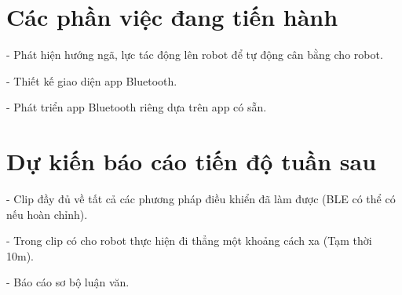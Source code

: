 \documentclass[12pt,a4paper]{article}
\begin{document}
\section{Các phần việc đang tiến hành }
\textrm{- Phát hiện hướng ngã, lực tác động lên robot để tự động cân bằng cho robot}.\par
\textrm{- Thiết kế giao diện app Bluetooth}.\par
\textrm{- Phát triển app Bluetooth riêng dựa trên app có sẵn}.\par
\newpage
\newpage
\section{Dự kiến báo cáo tiến độ tuần sau }
\textrm{- Clip đầy đủ về tất cả các phương pháp điều khiển đã làm được (BLE có thể có nếu hoàn chỉnh)}.\par
\textrm{- Trong clip có cho robot thực hiện đi thẳng một khoảng cách xa (Tạm thời 10m)}.\par
\textrm{- Báo cáo sơ bộ luận văn}.\par
\newpage
\end{document}
